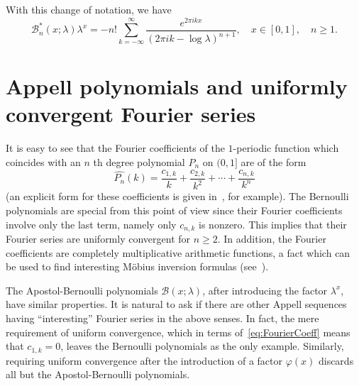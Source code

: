 \documentclass[11pt,a4paper]{amsart}
\newcommand{\AB}{\mathcal{B}}
\theoremstyle{plain}
\theoremstyle{plain}
\theoremstyle{plain}
\theoremstyle{remark}
\begin{document}
With this change of notation, we have
\begin{equation}
\label{eq:SFApostol-Ber*}
  \AB^*_n(x;\lambda)\lambda^x
  = -n!\sum_{k=-\infty}^\infty \frac{e^{2\pi ikx}}{(2\pi i k -\log\lambda)^{n+1}},
  \quad x\in [0,1], \quad n\geq 1.
\end{equation}


\section{Appell polynomials and uniformly convergent Fourier series}
\label{sec:characterization}


It is easy to see that the Fourier coefficients of the $1$-periodic function which coincides with an $n$ th degree polynomial $P_{n}$ on $(0,1]$ are of the form
\begin{equation}
\label{eq:FourierCoeff}
	\widehat{P_n}(k) = \frac{c_{1,k}}{k} + \frac{c_{2,k}}{k^2} + \cdots+\frac{c_{n,k}}{k^n}
\end{equation}
(an explicit form for these coefficients is given in~\cite[Lemma 10]{MT}, for example).
The Bernoulli polynomials are special from this point of view since their Fourier coefficients involve only the last term, namely only $c_{n,k}$ is nonzero. This implies that their Fourier series are uniformly convergent for $n \geq 2$. In addition, the Fourier coefficients are completely multiplicative arithmetic functions, a fact which can be used to find interesting M\"obius inversion formulas (see~\cite{NRV-Mobius}).

The Apostol-Bernoulli polynomials $\AB(x;\lambda)$, after introducing the factor $\lambda^{x}$, have similar properties. It is natural to ask if there are other Appell sequences having ``interesting'' Fourier series in the above senses. In fact, the mere requirement of uniform convergence, which in terms of~\eqref{eq:FourierCoeff} means that $c_{1,k} = 0$, leaves the Bernoulli polynomials as the only example. Similarly, requiring uniform convergence after the introduction of a factor $\varphi(x)$ discards all but the Apostol-Bernoulli polynomials.
\end{document}
